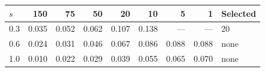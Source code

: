 \begin{tabular}{@{}lrrrrrrrl@{}}
\toprule
$s$ & 150 & 75 & 50 & 20 & 10 & 5 & 1 & Selected \\
\midrule
0.3 & 0.035 & 0.052 & 0.062 & 0.107 & 0.138 & --- & --- & 20 \\
0.6 & 0.024 & 0.031 & 0.046 & 0.067 & 0.086 & 0.088 & 0.088 & none \\
1.0 & 0.010 & 0.022 & 0.029 & 0.039 & 0.055 & 0.065 & 0.070 & none \\
\bottomrule
\end{tabular}
